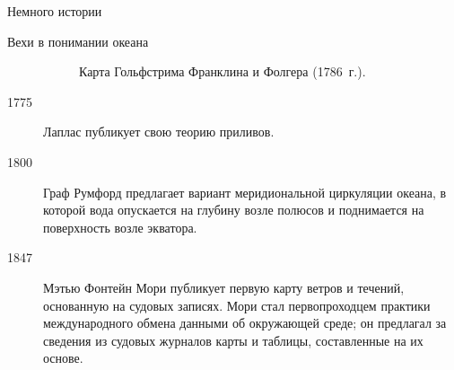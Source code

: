 \begin{chapter}{Немного истории}
\begin{section}{Вехи в понимании океана}
\begin{description}
\begin{figure}[h]
\caption{Карта Гольфстрима Франклина и Фолгера (1786~г.).}
\label{fig:Fig2-7}
\end{figure}
%

\item[1775] Лаплас публикует свою теорию приливов.

\item[1800] Граф Румфорд предлагает вариант
меридиональной циркуляции океана, в которой вода опускается на глубину
возле полюсов и поднимается на поверхность возле экватора.
%

\item[1847] Мэтью Фонтейн Мори публикует первую карту ветров и
течений, основанную на судовых записях. Мори стал первопроходцем практики
международного обмена данными об окружающей среде; он предлагал за сведения из 
судовых журналов карты и таблицы, составленные на их основе.
%


\end{description}
\end{section}
\end{chapter}
